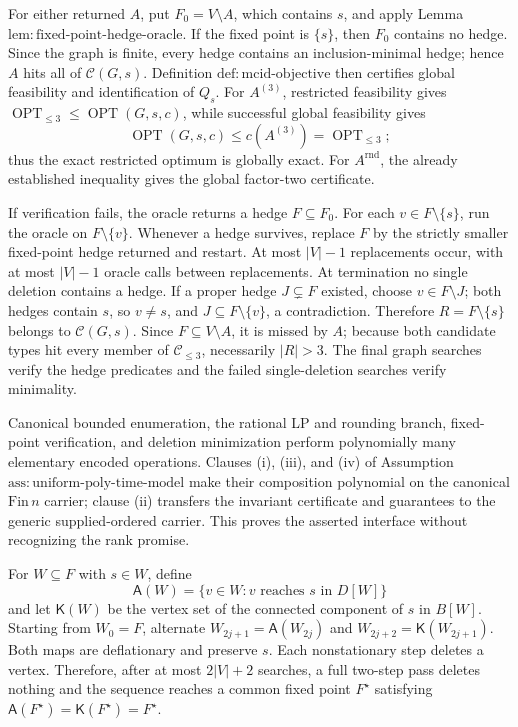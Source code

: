 For either returned \(A\), put \(F_0=V\setminus A\), which contains \(s\),
and apply Lemma
\(\mathrm{lem{:}fixed\mbox{-}point\mbox{-}hedge\mbox{-}oracle}\).  If the
fixed point is \(\{s\}\), then \(F_0\) contains no hedge.  Since the graph
is finite, every hedge contains an inclusion-minimal hedge; hence \(A\)
hits all of \(\mathcal C(G,s)\).  Definition
\(\mathrm{def{:}mcid\mbox{-}objective}\) then certifies global feasibility
and identification of \(Q_s\).  For \(A^{(3)}\), restricted feasibility
gives \(\operatorname{OPT}_{\leq3}\leq\operatorname{OPT}(G,s,c)\), while
successful global feasibility gives
\[
 \operatorname{OPT}(G,s,c)
 \leq c(A^{(3)})=\operatorname{OPT}_{\leq3};
\]
thus the exact restricted optimum is globally exact.  For
\(A^{\mathrm{rnd}}\), the already established inequality gives the global
factor-two certificate.

If verification fails, the oracle returns a hedge \(F\subseteq F_0\).
For each \(v\in F\setminus\{s\}\), run the oracle on
\(F\setminus\{v\}\).  Whenever a hedge survives, replace \(F\) by the
strictly smaller fixed-point hedge returned and restart.  At most
\(|V|-1\) replacements occur, with at most \(|V|-1\) oracle calls between
replacements.  At termination no single deletion contains a hedge.  If a
proper hedge \(J\subsetneq F\) existed, choose
\(v\in F\setminus J\); both hedges contain \(s\), so \(v\neq s\), and
\(J\subseteq F\setminus\{v\}\), a contradiction.  Therefore
\(R=F\setminus\{s\}\) belongs to \(\mathcal C(G,s)\).  Since
\(F\subseteq V\setminus A\), it is missed by \(A\); because both candidate
types hit every member of \(\mathcal C_{\leq3}\), necessarily \(|R|>3\).
The final graph searches verify the hedge predicates and the failed
single-deletion searches verify minimality.

Canonical bounded enumeration, the rational LP and rounding branch,
fixed-point verification, and deletion minimization perform polynomially
many elementary encoded operations.  Clauses (i), (iii), and (iv) of
Assumption \(\mathrm{ass{:}uniform\mbox{-}poly\mbox{-}time\mbox{-}model}\)
make their composition polynomial on the canonical \(\mathrm{Fin}\,n\)
carrier; clause (ii) transfers the invariant certificate and guarantees to
the generic supplied-ordered carrier.  This proves the asserted interface
without recognizing the rank promise.

For \(W\subseteq F\) with \(s\in W\), define
\[
 \mathsf A(W)=\{v\in W:v\text{ reaches }s\text{ in }D[W]\}
\]
and let \(\mathsf K(W)\) be the vertex set of the connected component of
\(s\) in \(B[W]\).  Starting from \(W_0=F\), alternate
\(W_{2j+1}=\mathsf A(W_{2j})\) and
\(W_{2j+2}=\mathsf K(W_{2j+1})\).  Both maps are deflationary and preserve
\(s\).  Each nonstationary step deletes a vertex.  Therefore, after at most
\(2|V|+2\) searches, a full two-step pass deletes nothing and the sequence
reaches a common fixed point \(F^{\star}\) satisfying
\(\mathsf A(F^{\star})=\mathsf K(F^{\star})=F^{\star}\).

